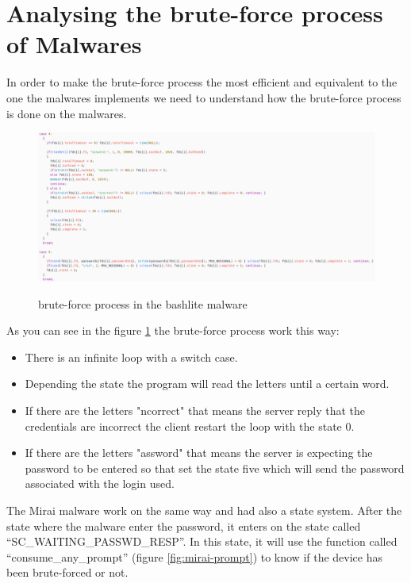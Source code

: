 \documentclass{report}
\begin{document}
\section{Analysing the brute-force process of Malwares}
In order to make the brute-force process the most efficient and equivalent to the one the malwares implements we need to understand how the brute-force process is done on the malwares.
\begin{figure}
 \caption{brute-force process in the bashlite malware}
 \includegraphics[width=1.2\textwidth]{./img/bashlite-bruteforce}
 \label{fig:bashlite-brute}
\end{figure}
As you can see in the figure \ref{fig:bashlite-brute} the brute-force process work this way:
\begin{itemize}
\item There is an infinite loop with a switch case.

\item Depending the state the program will read the letters until a certain word.

\item If there are the letters "ncorrect" that means the server reply that the credentials are incorrect the client restart the loop with the state 0.

\item If there are the letters "assword" that means the server is expecting the password to be entered so that set the state five which will send the password associated with the login used.
\end{itemize}

The Mirai malware work on the same way and had also a state system. After the state where the malware enter the password, it enters on the state called ``SC\_WAITING\_PASSWD\_RESP''. In this state, it will use the function called ``consume\_any\_prompt'' (figure \ref{fig:mirai-prompt}) to know if the device has been brute-forced or not.
\end{document}
